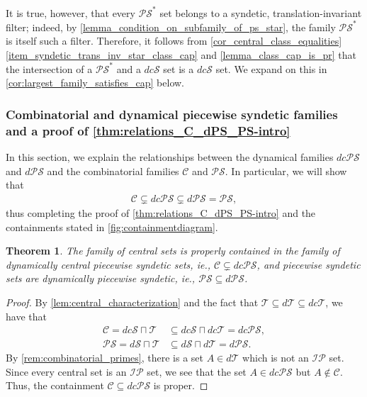 \documentclass[letter,11pt]{article}
\theoremstyle{plain}
\newtheorem{theorem}{Theorem}
\theoremstyle{definition}
\theoremstyle{plain}
\theoremstyle{plain}
\numberwithin{equation}{section}
\newcommand{\thick}{\mathcal{T}}
\newcommand{\dsyndetic}{d\mathcal{S}}
\newcommand{\dthick}{d\mathcal{T}}
\newcommand{\dcsyndetic}{dc\mathcal{S}}
\newcommand{\dcthick}{dc\mathcal{T}}
\newcommand{\PS}{\mathcal{PS}}
\newcommand{\dPS}{d\mathcal{PS}}
\newcommand{\dcPS}{dc\mathcal{PS}}
\newcommand{\central}{\mathcal{C}}
\newcommand{\IP}{\mathcal{IP}}
\newcommand{\classcap}{\sqcap}
\begin{document}
It is true, however, that every $\PS^*$ set belongs to a syndetic, translation-invariant filter; indeed, by \cref{lemma_condition_on_subfamily_of_ps_star}, the family $\PS^*$ is itself such a filter.  Therefore, it follows from \cref{cor_central_class_equalities} \eqref{item_syndetic_trans_inv_star_class_cap} and \cref{lemma_class_cap_is_pr} that the intersection of a $\PS^*$ and a $\dcsyndetic$ set is a $\dcsyndetic$ set. We expand on this in \cref{cor:largest_family_satisfies_cap} below.  



\subsubsection{Combinatorial and dynamical piecewise syndetic families and a proof of \cref{thm:relations_C_dPS_PS-intro}}
\label{sec_dcps_relations}

In this section, we explain the relationships between the dynamical families $\dcPS$ and $\dPS$ and the combinatorial families $\central$ and $\PS$. In particular, we will show that
\begin{align}
    \label{eqn_main_containments}
    \central \subsetneq \dcPS \subsetneq \dPS = \PS,
\end{align}
thus completing the proof of \cref{thm:relations_C_dPS_PS-intro} and the containments stated in \cref{fig:containmentdiagram}.

\begin{theorem}
\label{thm_c_is_dcps}
\label{thm_ps_is_dps}
    The family of central sets is properly contained in the family of dynamically central piecewise syndetic sets, ie., $\central \subsetneq \dcPS$, and piecewise syndetic sets are dynamically piecewise syndetic, ie., $\PS \subseteq \dPS$.
\end{theorem}

\begin{proof}
    By \cref{lem:central_characterization} and the fact that $\thick \subseteq \dthick \subseteq \dcthick$, we have that
    \begin{align*}
        \central = \dcsyndetic \classcap \thick &\subseteq \dcsyndetic \classcap \dcthick = \dcPS,\\
        \PS = \dsyndetic \classcap \thick &\subseteq \dsyndetic \classcap \dthick = \dPS.
    \end{align*}
    By \cref{rem:combinatorial_primes}, there is a set $A \in \dthick$ which is not an $\IP$ set. Since every central set is an $\IP$ set, we see that the set $A \in \dcPS$ but $A \not \in \central$. Thus, the containment $\central \subseteq \dcPS$ is proper.
\end{proof}
\end{document}

